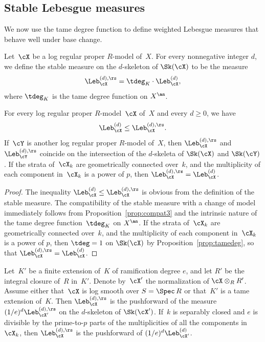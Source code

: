 \subsection{Stable Lebesgue measures}
We now use the tame degree function to define weighted Lebesgue measures that behave well under base change.
\begin{definition}\label{def:stablemeas}
Let~$\cX$ be a log regular proper $R$\nobreakdash-model of~$X$. For every nonnegative integer $d$, we define the
stable measure on the $d$\nobreakdash-skeleton of $\Sk(\cX)$ to be the measure
\[
\Leb_{\cX}^{(d),\rs}=\tdeg_K \cdot \Leb_{\cX}^{(d)},
\]
where $\tdeg_K$ is the tame degree function on $X^{\an}$.
\end{definition}
\begin{prop}\label{prop:stmeasure1}
For every log regular proper $R$\nobreakdash-model~$\cX$ of~$X$ and every $d\geq 0$, we have
\[
\Leb_{\cX}^{(d)} \leq \Leb_{\cX}^{(d),\rs}.
\]
If~$\cY$ is another log regular proper $R$\nobreakdash-model of~$X$, then $\Leb_{\cX}^{(d),\rs}$ and $\Leb_{\cY}^{(d),\rs}$ coincide on the intersection of the $d$\nobreakdash-skeleta of $\Sk(\cX)$ and $\Sk(\cY)$. If the strata of~$\cX_k$ are geometrically connected over~$k$, and the multiplicity of each component in~$\cX_k$ is a power of $p$, then $\Leb_{\cX}^{(d),\rs}=\Leb_{\cX}^{(d)}$.
\end{prop}
\begin{proof}
The inequality $\Leb_{\cX}^{(d)} \leq \Leb_{\cX}^{(d),\rs}$ is obvious from the definition of the stable measure.
The compatibility of the stable measure with a change of model immediately follows from Proposition~\ref{prop:compat3} and the intrinsic nature of the tame degree function~$\tdeg_K$ on $X^{\an}$. If the strata of~$\cX_k$ are geometrically connected over~$k$, and the multiplicity of each component in~$\cX_k$ is a power of $p$, then $\tdeg=1$ on $\Sk(\cX)$ by Proposition~\ref{prop:tamedeg}, so that $\Leb_{\cX}^{(d),\rs}=\Leb_{\cX}^{(d)}$.
\end{proof}
\begin{prop}\label{prop:stmeasure2}
Let~$K'$ be a finite extension of~$K$ of ramification degree $e$, and let $R'$ be the integral closure of~$R$ in~$K'$. Denote by~$\cX'$ the normalization of $\cX\otimes_R R'$.
Assume either that~$\cX$ is log smooth over $S=\Spec\,R$ or that~$K'$ is a tame extension of~$K$. Then $\Leb^{(d),\rs}_{\cX}$ is the pushforward of the measure $(1/e)^d\Leb^{(d),\rs}_{\cX'}$ on the $d$\nobreakdash-skeleton of $\Sk(\cX')$. If~$k$ is separably closed and $e$ is divisible by the prime-to-$p$ parts of the multiplicities of all the components in~$\cX_k$, then $\Leb^{(d),\rs}_{\cX}$ is the pushforward of $(1/e)^d\Leb^{(d)}_{\cX'}$.
\end{prop}
